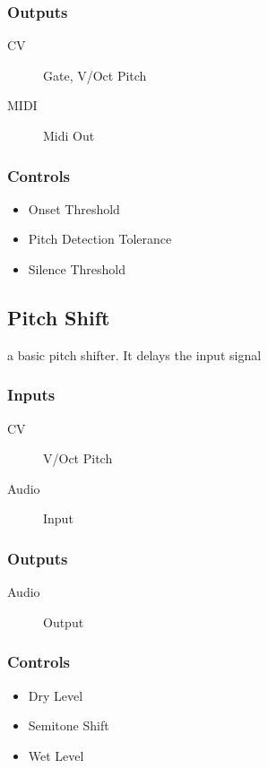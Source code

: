 \subsubsection{Outputs}
\begin{description}
\item [CV] Gate, V/Oct Pitch
\item [MIDI] Midi Out
\end{description}

\subsubsection{Controls}
\begin{itemize}
\item Onset Threshold
\item Pitch Detection Tolerance
\item Silence Threshold
\end{itemize}

\subsection{Pitch Shift}

a basic pitch shifter. It delays the input signal



\subsubsection{Inputs}
\begin{description}
\item [CV] V/Oct Pitch
\item [Audio] Input
\end{description}

\subsubsection{Outputs}
\begin{description}
\item [Audio] Output
\end{description}

\subsubsection{Controls}
\begin{itemize}
\item Dry Level
\item Semitone Shift
\item Wet Level
\end{itemize}

